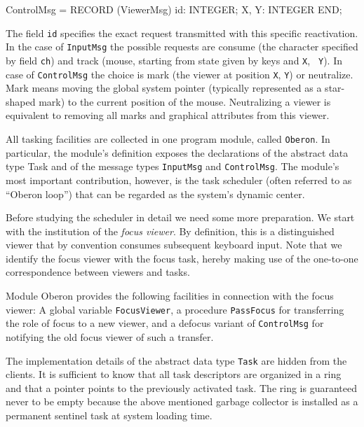 ControlMsg = RECORD (ViewerMsg)
  id: INTEGER;
  X, Y: INTEGER
END;
\endtt

\noindent The field {\tt id\/} specifies the exact request transmitted with this
specific reactivation. In the case of {\tt InputMsg\/} the possible
requests are consume (the character specified by field {\tt ch\/}) and
track (mouse, starting from state given by keys and {\tt X\/}, {\tt
  Y\/}). In case of {\tt ControlMsg\/} the choice is mark (the viewer
at position {\tt X\/}, {\tt Y\/}) or neutralize. Mark means moving the
global system pointer (typically represented as a star-shaped mark) to
the current position of the mouse. Neutralizing a viewer is equivalent
to removing all marks and graphical attributes from this viewer.

All tasking facilities are collected in one program module, called
{\tt Oberon\/}. In particular, the module's definition exposes the
declarations of the abstract data type Task and of the message types
{\tt InputMsg\/} and {\tt ControlMsg\/}. The module's most important contribution,
however, is the task scheduler (often referred to as ``Oberon loop'')
that can be regarded as the system's dynamic center.

Before studying the scheduler in detail we need some more
preparation. We start with the institution of the {\it focus viewer\/}. By
definition, this is a distinguished viewer that by convention consumes
subsequent keyboard input. Note that we identify the focus viewer with
the focus task, hereby making use of the one-to-one correspondence
between viewers and tasks.

Module Oberon provides the following facilities in connection with the
focus viewer: A global variable {\tt FocusViewer\/}, a procedure {\tt PassFocus\/} for
transferring the role of focus to a new viewer, and a defocus variant
of {\tt ControlMsg\/} for notifying the old focus viewer of such a transfer.

The implementation details of the abstract data type {\tt Task\/} are hidden
from the clients. It is sufficient to know that all task descriptors
are organized in a ring and that a pointer points to the previously
activated task. The ring is guaranteed never to be empty because the
above mentioned garbage collector is installed as a permanent sentinel
task at system loading time.

